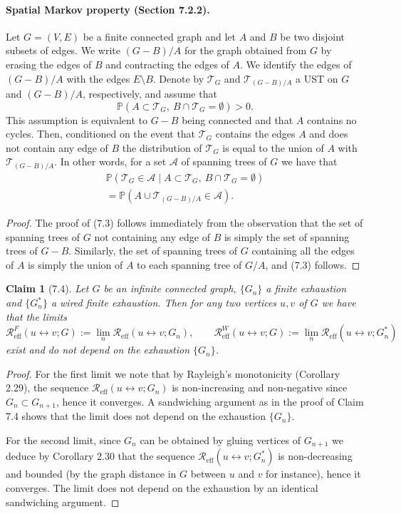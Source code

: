 \documentclass[UTF8,11pt]{ctexart}
\newtheorem*{claim}{Claim}
\theoremstyle{definition}
\newcommand{\Prob}{\mathbb P}
\newcommand{\Reff}{\mathcal R_{\mathrm{eff}}}
\begin{document}
\paragraph{Spatial Markov property (Section 7.2.2).}
Let $G=(V,E)$ be a finite connected graph and let $A$ and $B$ be two disjoint subsets of edges. We write $(G-B)/A$ for the graph obtained from $G$ by erasing the edges of $B$ and contracting the edges of $A$. We identify the edges of $(G-B)/A$ with the edges $E\setminus B$. Denote by $\mathcal T_G$ and $\mathcal T_{(G-B)/A}$ a UST on $G$ and $(G-B)/A$, respectively, and assume that
\[
\Prob(A\subset\mathcal T_G,\ B\cap\mathcal T_G=\emptyset)>0.
\]
This assumption is equivalent to $G-B$ being connected and that $A$ contains no cycles.
Then, conditioned on the event that $\mathcal T_G$ contains the edges $A$ and does not contain any edge of $B$ the distribution of $\mathcal T_G$ is equal to the union of $A$ with $\mathcal T_{(G-B)/A}$. In other words, for a set $\mathcal A$ of spanning trees of $G$ we have that
\begin{multline*}
\Prob(\mathcal T_G\in\mathcal A\mid A\subset\mathcal T_G,\ B\cap\mathcal T_G=\emptyset)\\
=\Prob(A\cup\mathcal T_{(G-B)/A}\in\mathcal A).\tag{7.3}
\end{multline*}
\begin{proof}
The proof of (7.3) follows immediately from the observation that the set of spanning trees of $G$ not containing any edge of $B$ is simply the set of spanning trees of $G-B$. Similarly, the set of spanning trees of $G$ containing all the edges of $A$ is simply the union of $A$ to each spanning tree of $G/A$, and (7.3) follows.
\end{proof}

\begin{claim}[7.4]
Let $G$ be an infinite connected graph, $\{G_n\}$ a finite exhaustion and $\{G_n^*\}$ a wired finite exhaustion. Then for any two vertices $u,v$ of $G$ we have that the limits
\[
\Reff^F(u\leftrightarrow v;G):=\lim_n\Reff(u\leftrightarrow v;G_n),
\qquad
\Reff^W(u\leftrightarrow v;G):=\lim_n\Reff(u\leftrightarrow v;G_n^*)
\]
exist and do not depend on the exhaustion $\{G_n\}$.
\end{claim}
\begin{proof}
For the first limit we note that by Rayleigh's monotonicity (Corollary 2.29), the sequence $\Reff(u\leftrightarrow v;G_n)$ is non-increasing and non-negative since $G_n\subset G_{n+1}$, hence it converges. A sandwiching argument as in the proof of Claim 7.4 shows that the limit does not depend on the exhaustion $\{G_n\}$.

For the second limit, since $G_n$ can be obtained by gluing vertices of $G_{n+1}$ we deduce by Corollary 2.30 that the sequence $\Reff(u\leftrightarrow v;G_n^*)$ is non-decreasing and bounded (by the graph distance in $G$ between $u$ and $v$ for instance), hence it converges. The limit does not depend on the exhaustion by an identical sandwiching argument.
\end{proof}
\end{document}
